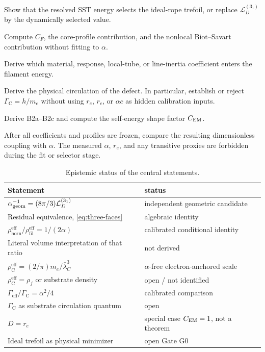 \documentclass[aps,pre,preprint,notitlepage,nofootinbib,superscriptaddress]{revtex4-2}
\newcommand{\lC}{\bar\lambda_C}
\newcommand{\re}{r_e}
\newcommand{\calL}{\mathcal L}
\newcommand{\rhohorn}{\rho_{\mathrm{horn}}^{\mathrm{eff}}}
\newcommand{\rhofil}{\rho_{\mathrm{fil}}^{\mathrm{eff}}}
\newcommand{\rhoCeff}{\rho_{\mathrm C}^{\mathrm{eff}}}
\newcommand{\Gammaeff}{\Gamma_{\mathrm{eff}}}
\newcommand{\GammaC}{\Gamma_{\mathrm C}}
\begin{document}
\begin{description}[leftmargin=2.3cm,style=nextline]
  \item[\textbf{G0: dynamics}]
  Show that the resolved SST energy selects the ideal-rope trefoil, or replace \(\calL_D^{(3_1)}\) by the dynamically selected value.

  \item[\textbf{G1: line energy}]
  Compute \(C_F\), the core-profile contribution, and the nonlocal Biot--Savart contribution without fitting to \(\alpha\).

  \item[\textbf{G2: density sector}]
  Derive which material, response, local-tube, or line-inertia coefficient enters the filament energy.

  \item[\textbf{G3: circulation}]
  Derive the physical circulation of the defect.  In particular, establish or reject \(\GammaC=h/m_e\) without using \(r_e\), \(r_c\), or \(\alpha c\) as hidden calibration inputs.

  \item[\textbf{G4: electromagnetism}]
  Derive B2a--B2c and compute the self-energy shape factor \(C_{\rm EM}\).

  \item[\textbf{G5: out-of-sample test}]
  After all coefficients and profiles are frozen, compare the resulting dimensionless coupling with \(\alpha\).  The measured \(\alpha\), \(r_e\), and any transitive proxies are forbidden during the fit or selector stage.
\end{description}

\begin{table}[t]
\caption{Epistemic status of the central statements.}
\label{tab:status}
\begin{ruledtabular}
\begin{tabular}{ll}
Statement & status\\
\hline
\(\alpha_{\rm geom}^{-1}=(8\pi/3)\calL_D^{(3_1)}\) & independent geometric candidate\\
Residual equivalence, \cref{eq:three-faces} & algebraic identity\\
\(\rhohorn/\rhofil=1/(2\alpha)\) & calibrated conditional identity\\
Literal volume interpretation of that ratio & not derived\\
\(\rhoCeff=(2/\pi)m_e/\lC^3\) & \(\alpha\)-free electron-anchored scale\\
\(\rhoCeff=\rho_{\!f}\) or substrate density & open / not identified\\
\(\Gammaeff/\GammaC=\alpha^2/4\) & calibrated comparison\\
\(\GammaC\) as substrate circulation quantum & open\\
\(D=\re\) & special case \(C_{\rm EM}=1\), not a theorem\\
Ideal trefoil as physical minimizer & open Gate G0\\
\end{tabular}
\end{ruledtabular}
\end{table}
\end{document}

